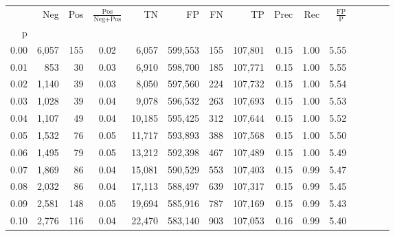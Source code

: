\begin{tabular}{rrrcrrrrrrrrrrr}
\toprule
{} &     Neg &    Pos & $\frac{\text{Pos}}{\text{Neg}+\text{Pos}}$ &       TN &       FP &       FN &       TP &  Prec &   Rec & $\frac{\text{FP}}{\text{P}}$ \\
p    &         &        &                                            &          &          &          &          &       &       &                              \\
\midrule
0.00 &   6,057 &    155 &                                       0.02 &    6,057 &  599,553 &      155 &  107,801 &  0.15 &  1.00 &                         5.55 \\
0.01 &     853 &     30 &                                       0.03 &    6,910 &  598,700 &      185 &  107,771 &  0.15 &  1.00 &                         5.55 \\
0.02 &   1,140 &     39 &                                       0.03 &    8,050 &  597,560 &      224 &  107,732 &  0.15 &  1.00 &                         5.54 \\
0.03 &   1,028 &     39 &                                       0.04 &    9,078 &  596,532 &      263 &  107,693 &  0.15 &  1.00 &                         5.53 \\
0.04 &   1,107 &     49 &                                       0.04 &   10,185 &  595,425 &      312 &  107,644 &  0.15 &  1.00 &                         5.52 \\
0.05 &   1,532 &     76 &                                       0.05 &   11,717 &  593,893 &      388 &  107,568 &  0.15 &  1.00 &                         5.50 \\
0.06 &   1,495 &     79 &                                       0.05 &   13,212 &  592,398 &      467 &  107,489 &  0.15 &  1.00 &                         5.49 \\
0.07 &   1,869 &     86 &                                       0.04 &   15,081 &  590,529 &      553 &  107,403 &  0.15 &  0.99 &                         5.47 \\
0.08 &   2,032 &     86 &                                       0.04 &   17,113 &  588,497 &      639 &  107,317 &  0.15 &  0.99 &                         5.45 \\
0.09 &   2,581 &    148 &                                       0.05 &   19,694 &  585,916 &      787 &  107,169 &  0.15 &  0.99 &                         5.43 \\
0.10 &   2,776 &    116 &                                       0.04 &   22,470 &  583,140 &      903 &  107,053 &  0.16 &  0.99 &                         5.40 \\

\end{tabular}
